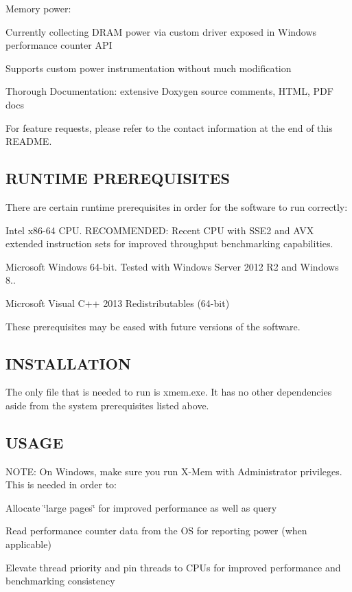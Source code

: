 Memory power\+:
\begin{DoxyItemize}
\item Currently collecting D\+R\+A\+M power via custom driver exposed in Windows performance counter A\+P\+I
\item Supports custom power instrumentation without much modification
\item Thorough Documentation\+: extensive Doxygen source comments, H\+T\+M\+L, P\+D\+F docs
\end{DoxyItemize}

For feature requests, please refer to the contact information at the end of this R\+E\+A\+D\+M\+E. 

 \subsection*{R\+U\+N\+T\+I\+M\+E P\+R\+E\+R\+E\+Q\+U\+I\+S\+I\+T\+E\+S }

There are certain runtime prerequisites in order for the software to run correctly\+:


\begin{DoxyItemize}
\item Intel x86-\/64 C\+P\+U. R\+E\+C\+O\+M\+M\+E\+N\+D\+E\+D\+: Recent C\+P\+U with S\+S\+E2 and A\+V\+X extended instruction sets for improved throughput benchmarking capabilities.
\item Microsoft Windows 64-\/bit. Tested with Windows Server 2012 R2 and Windows 8..
\item Microsoft Visual C++ 2013 Redistributables (64-\/bit)
\end{DoxyItemize}

These prerequisites may be eased with future versions of the software. 

 \subsection*{I\+N\+S\+T\+A\+L\+L\+A\+T\+I\+O\+N }

The only file that is needed to run is xmem.\+exe. It has no other dependencies aside from the system prerequisites listed above. 

 \subsection*{U\+S\+A\+G\+E }

N\+O\+T\+E\+: On Windows, make sure you run X-\/\+Mem with Administrator privileges. This is needed in order to\+:
\begin{DoxyItemize}
\item Allocate \char`\"{}large pages\char`\"{} for improved performance as well as query
\item Read performance counter data from the O\+S for reporting power (when applicable)
\item Elevate thread priority and pin threads to C\+P\+Us for improved performance and benchmarking consistency
\end{DoxyItemize}

